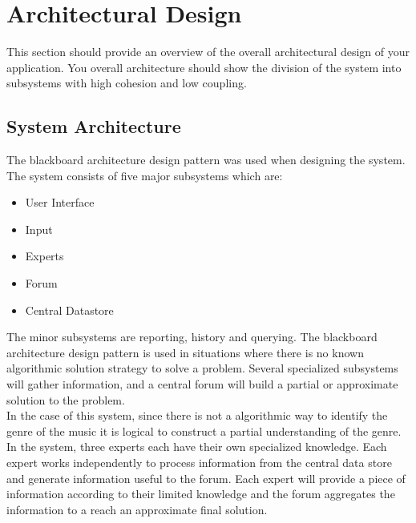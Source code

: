 \documentclass[]{article}
\begin{document}
\newpage
\section{Architectural Design}
\label{sec:architectural_design}
This section should provide an overview of the overall architectural design of your application. You overall architecture should show the division of the system into subsystems with high cohesion and low coupling.

\subsection{System Architecture}
\label{sub:system_architecture}
The blackboard architecture design pattern was used when designing the system. The system consists of five major subsystems which are: 
\begin{itemize}
\item User Interface
\item Input
\item Experts
\item Forum
\item Central Datastore 
\end{itemize}
The minor subsystems are reporting, history and querying. 
The blackboard architecture design pattern is used in situations where there is no known algorithmic solution strategy to solve a problem. Several specialized subsystems will gather information, and a central forum will build a partial or approximate solution to the problem. \\
In the case of this system, since there is not a algorithmic way to identify the genre of the music it is logical to construct a partial understanding of the genre. In the system, three experts each have their own specialized knowledge. Each expert works independently to process information from the central data store and generate information useful to the forum. Each expert will provide a piece of information according to their limited knowledge and the forum aggregates the information to a reach an approximate final solution.
\end{document}
